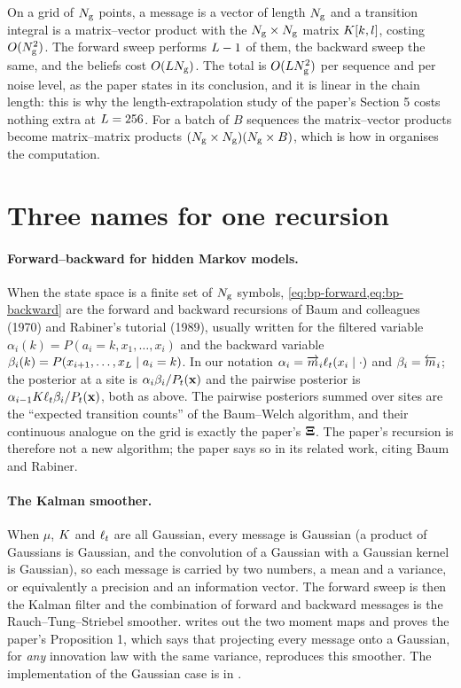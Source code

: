 On a grid of $N_{\mathrm{g}}$ points, a message is a vector of length $N_{\mathrm{g}}$ and a
transition integral is a matrix--vector product with the $N_{\mathrm{g}}\times N_{\mathrm{g}}$ matrix
$K[k,l]$, costing $O(N_{\mathrm{g}}^2)$. The forward sweep performs $L-1$ of them,
the backward sweep the same, and the beliefs cost $O(LN_{\mathrm{g}})$. The total is
$O(LN_{\mathrm{g}}^2)$ per sequence and per noise level, as the paper states in its
conclusion, and it is linear in the chain length: this is why the length-extrapolation
study of the paper's Section 5 costs nothing extra at $L=256$. For a batch of
$B$ sequences the matrix--vector products become matrix--matrix products
$(N_{\mathrm{g}}\times N_{\mathrm{g}})(N_{\mathrm{g}}\times B)$, which is how  in
 organises the computation.

\section{Three names for one recursion}

\paragraph{Forward--backward for hidden Markov models.}
When the state space is a finite set of $N_{\mathrm{g}}$ symbols, \cref{eq:bp-forward,eq:bp-backward}
are the forward and backward recursions of Baum and colleagues (1970) and Rabiner's
tutorial (1989), usually written for the filtered variable
$\alpha_i(k)=P(a_i=k,x_1,\dots,x_i)$ and the backward variable
$\beta_i(k)=P(x_{i+1},\dots,x_L\mid a_i=k)$. In our notation
$\alpha_i=\overrightarrow{m}_i\ell_t(x_i\mid\cdot)$ and $\beta_i=\overleftarrow{m}_i$; the posterior at a site is
$\alpha_i\beta_i/P_t(\mathbf{x})$ and the pairwise posterior is
$\alpha_{i-1}K\ell_t\beta_i/P_t(\mathbf{x})$, both as above. The pairwise posteriors summed
over sites are the ``expected transition counts'' of the Baum--Welch algorithm, and
their continuous analogue on the grid is exactly the paper's $\mathbf{\Xi}$. The paper's
recursion is therefore not a new algorithm; the paper says so in its related work,
citing Baum and Rabiner.

\paragraph{The Kalman smoother.}
When $\mu$, $K$ and $\ell_t$ are all Gaussian, every message is Gaussian (a
product of Gaussians is Gaussian, and the convolution of a Gaussian with a Gaussian
kernel is Gaussian), so each message is carried by two numbers, a mean and a variance,
or equivalently a precision and an information vector. The forward sweep is then the
Kalman filter and the combination of forward and backward messages is the
Rauch--Tung--Striebel smoother.  writes out the two
moment maps and proves the paper's Proposition 1, which says that projecting every
message onto a Gaussian, for \emph{any} innovation law with the same variance,
reproduces this smoother. The implementation of the Gaussian case is
 in .

